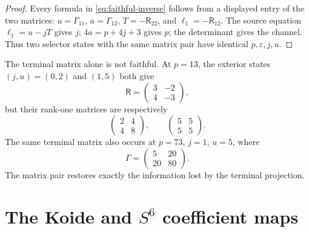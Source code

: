 \documentclass[11pt]{article}
\theoremstyle{definition}
\theoremstyle{remark}
\begin{document}
\begin{proof}
Every formula in \eqref{eq:faithful-inverse} follows from a displayed entry of
the two matrices: $u=\Gamma_{11}$, $a=\Gamma_{12}$,
$T=-\mathsf R_{22}$, and $\ell_1=-\mathsf R_{12}$.  The source equation
$\ell_1=u-jT$ gives $j$; $4a=p+4j+3$ gives $p$; the determinant gives the
channel.  Thus two selector states with the same matrix pair have identical
$p,\varepsilon,j,u$.
\end{proof}

The terminal matrix alone is not faithful.  At $p=13$, the exterior states
$(j,u)=(0,2)$ and $(1,5)$ both give
\begin{equation}\label{eq:same-terminal}
 \mathsf R=\begin{pmatrix}3&-2\\4&-3\end{pmatrix},
\end{equation}
but their rank-one matrices are respectively
\begin{equation}\label{eq:different-gamma}
 \begin{pmatrix}2&4\\4&8\end{pmatrix},
 \qquad
 \begin{pmatrix}5&5\\5&5\end{pmatrix}.
\end{equation}
The same terminal matrix also occurs at $p=73$, $j=1$, $u=5$, where
\begin{equation}\label{eq:p73-gamma}
 \Gamma=\begin{pmatrix}5&20\\20&80\end{pmatrix}.
\end{equation}
The matrix pair restores exactly the information lost by the terminal
projection.

\section{The Koide and \texorpdfstring{$S^6$}{S6} coefficient maps}
\end{document}
